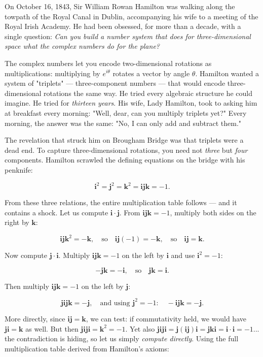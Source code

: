 \documentclass[11pt,twoside,openright]{book}
\theoremstyle{definition}
\theoremstyle{remark}
\begin{document}
On October 16, 1843, Sir William Rowan Hamilton was walking along the towpath of the Royal Canal in Dublin, accompanying his wife to a meeting of the Royal Irish Academy. He had been obsessed, for more than a decade, with a single question: \textit{Can you build a number system that does for three-dimensional space what the complex numbers do for the plane?}

The complex numbers let you encode two-dimensional rotations as multiplications: multiplying by $e^{i\theta}$ rotates a vector by angle $\theta$. Hamilton wanted a system of "triplets" --- three-component numbers --- that would encode three-dimensional rotations the same way. He tried every algebraic structure he could imagine. He tried for \textit{thirteen years}. His wife, Lady Hamilton, took to asking him at breakfast every morning: "Well, dear, can you multiply triplets yet?" Every morning, the answer was the same: "No, I can only add and subtract them."

The revelation that struck him on Brougham Bridge was that triplets were a dead end. To capture three-dimensional rotations, you need not \textit{three} but \textit{four} components. Hamilton scrawled the defining equations on the bridge with his penknife:

\[\mathbf{i}^2 = \mathbf{j}^2 = \mathbf{k}^2 = \mathbf{i}\mathbf{j}\mathbf{k} = -1.\]

From these three relations, the entire multiplication table follows --- and it contains a shock. Let us compute $\mathbf{i} \cdot \mathbf{j}$. From $\mathbf{i}\mathbf{j}\mathbf{k} = -1$, multiply both sides on the right by $\mathbf{k}$:

\[\mathbf{i}\mathbf{j}\mathbf{k}^2 = -\mathbf{k}, \quad \text{so} \quad \mathbf{i}\mathbf{j}(-1) = -\mathbf{k}, \quad \text{so} \quad \mathbf{i}\mathbf{j} = \mathbf{k}.\]

Now compute $\mathbf{j} \cdot \mathbf{i}$. Multiply $\mathbf{i}\mathbf{j}\mathbf{k} = -1$ on the left by $\mathbf{i}$ and use $\mathbf{i}^2 = -1$:

\[-\mathbf{j}\mathbf{k} = -\mathbf{i}, \quad \text{so} \quad \mathbf{j}\mathbf{k} = \mathbf{i}.\]

Then multiply $\mathbf{i}\mathbf{j}\mathbf{k} = -1$ on the left by $\mathbf{j}$:

\[\mathbf{j}\mathbf{i}\mathbf{j}\mathbf{k} = -\mathbf{j}, \quad \text{and using } \mathbf{j}^2 = -1: \quad -\mathbf{i}\mathbf{j}\mathbf{k} = -\mathbf{j}.\]

More directly, since $\mathbf{i}\mathbf{j} = \mathbf{k}$, we can test: if commutativity held, we would have $\mathbf{j}\mathbf{i} = \mathbf{k}$ as well. But then $\mathbf{j}\mathbf{i}\mathbf{j}\mathbf{i} = \mathbf{k}^2 = -1$. Yet also $\mathbf{j}\mathbf{i}\mathbf{j}\mathbf{i} = \mathbf{j}(\mathbf{i}\mathbf{j})\mathbf{i} = \mathbf{j}\mathbf{k}\mathbf{i} = \mathbf{i} \cdot \mathbf{i} = -1$... the contradiction is hiding, so let us simply \textit{compute directly}. Using the full multiplication table derived from Hamilton's axioms:
\end{document}
